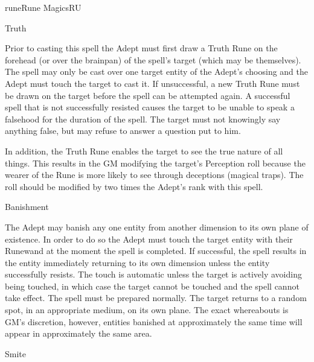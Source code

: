 \begin{college}[1.1]{rune}{Rune Magics}{RU}
\begin{spell}[S-5]{Truth}

\begin{effects}
Prior to casting this spell the Adept must first draw a Truth Rune on
the forehead (or over the brainpan) of the spell's target (which may
be themselves). The spell may only be cast over one target entity of the
Adept's choosing and the Adept must touch the target to cast it.  If
unsuccessful, a new Truth Rune must be drawn on the target before the
spell can be attempted again. A successful spell that is not
successfully resisted causes the target to be unable to speak a
falsehood for the duration of the spell. The target must not knowingly
say anything false, but may refuse to answer a question put to him.

In addition, the Truth Rune enables the target to see the true nature
of all things.  This results in the GM modifying the target's
Perception roll because the wearer of the Rune is more likely to see
through deceptions (\eg magical traps).  The roll should be modified
by two times the Adept's rank with this spell.
\end{effects}
\end{spell}

\begin{spell}[S-6]{Banishment}

\begin{effects}
The Adept may banish any one entity from another dimension to its own
plane of existence. In order to do so the Adept must touch the target
entity with their Runewand at the moment the spell is completed.  If
successful, the spell results in the entity immediately returning to
its own dimension unless the entity successfully resists. The touch is
automatic unless the target is actively avoiding being touched, in
which case the target cannot be touched and the spell cannot take
effect. The spell must be prepared normally. The target returns to a
random spot, in an appropriate medium, on its own plane.  The exact
whereabouts is GM's discretion, however, entities banished at
approximately the same time will appear in approximately the same
area.
\end{effects}
\end{spell}

\begin{spell}[S-7]{Smite}


\end{spell}
\end{college}

